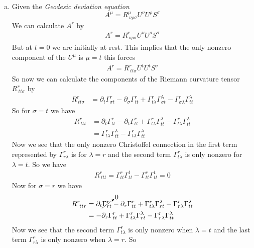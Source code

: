 \documentclass[11pt]{article}
\numberwithin{equation}{section}
\begin{document}
\begin{enumerate}[(a)]
\item
Given the \emph{Geodesic deviation equation} 
\begin{equation}
A^{\mu} = R^{\mu}_{\ \nu\rho\sigma}U^{\nu}U^{\rho}S^{\sigma}
\label{devi}
\end{equation}
We can calculate $A^r$ by
\begin{align*}
A^{r} = R^{r}_{\ \nu\rho\sigma}U^{\nu}U^{\rho}S^{\sigma}
\end{align*}
But at $t=0$ we are initially at rest. This implies that the only nonzero component of the $U^{\mu}$ is $\mu=t$ this forces
\begin{align*}
A^{r} = R^{r}_{\ tt\sigma}U^{t}U^{t}S^{\sigma}
\end{align*}
So now we can calculate the components of the Riemann curvature tensor $R^r_{\ tt\sigma}$ by 
\begin{align*}
R^{r}_{\ tt\sigma} &= \partial_{t}\Gamma^{r}_{\sigma t}-\partial_{\sigma}\Gamma^{r}_{t t} +\Gamma^{r}_{t\lambda}\Gamma^{\lambda}_{\sigma t} - \Gamma^{r}_{\sigma\lambda}\Gamma^{\lambda}_{t t}
\end{align*}
So for $\sigma = t$ we have
\begin{align*}
R^{r}_{\ ttt} &= \partial_{t}\Gamma^{r}_{t t}-\partial_{t}\Gamma^{r}_{t t} +\Gamma^{r}_{t\lambda}\Gamma^{\lambda}_{t t} - \Gamma^{r}_{t\lambda}\Gamma^{\lambda}_{t t}\\
&= \Gamma^{r}_{t\lambda}\Gamma^{\lambda}_{t t} - \Gamma^{r}_{t\lambda}\Gamma^{\lambda}_{t t}
\end{align*}
Now we see that the only nonzero Christoffel connection in the first term represented by $\Gamma^{r}_{r\lambda}$ is for $\lambda = r$ and the second term $\Gamma^{r}_{t\lambda}$ is only nonzero for $\lambda = t$. So we have
\begin{align*}
R^{r}_{\ ttt} = \Gamma^{r}_{tt}\Gamma^{t}_{t t} - \Gamma^{r}_{tt}\Gamma^{t}_{t t} = 0
\end{align*}
Now for $\sigma = r$ we have
\begin{align*}
R^{r}_{\ ttr} &= \partial_{t}\cancelto{0}{\Gamma^{r}_{r t}}-\partial_{r}\Gamma^{r}_{t t} +\Gamma^{r}_{t\lambda}\Gamma^{\lambda}_{r t} - \Gamma^{r}_{r\lambda}\Gamma^{\lambda}_{t t}\\
&= -\partial_{r}\Gamma^{r}_{t t} +\Gamma^{r}_{t\lambda}\Gamma^{\lambda}_{r t} - \Gamma^{r}_{r\lambda}\Gamma^{\lambda}_{t t}
\end{align*}
Now we see that the second term $\Gamma^{r}_{t\lambda}$ is only nonzero when $\lambda = t$ and the last term $\Gamma^{r}_{r\lambda}$ is only nonzero when $\lambda = r$. So 

\end{enumerate}
\end{document}
